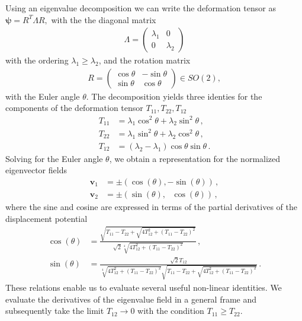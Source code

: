 \documentclass[a4paper, 11pt]{article}
\begin{document}
Using an eigenvalue decomposition we can write the deformation tensor as $\bm{\psi} = R^T \Lambda R,$ with the the diagonal matrix
\begin{align}
\Lambda = \begin{pmatrix}\lambda_1 & 0 \\ 0 &\lambda_2 \end{pmatrix}
\end{align}
with the ordering $\lambda_1 \geq \lambda_2$, and the rotation matrix
\begin{align}
R = \begin{pmatrix} \cos \theta & - \sin \theta \\ \sin \theta & \cos \theta \end{pmatrix} \in SO(2),
\end{align}
with the Euler angle $\theta$. The decomposition yields three identies for the components of the deformation tensor $T_{11},T_{22},T_{12}$ 
\begin{align}
T_{11} &= \lambda_1 \cos^2 \theta + \lambda_2 \sin^2 \theta\,,\\
T_{22} &= \lambda_1 \sin^2\theta + \lambda_2 \cos^2 \theta\,,\\
T_{12} &= (\lambda_2 - \lambda_1)\cos \theta \sin \theta\,.
\end{align}
Solving for the Euler angle $\theta$, we obtain a representation for the normalized eigenvector fields
\begin{align}
\bm{v}_1 &=\pm (\cos(\theta), -\sin(\theta))\,,\\
\bm{v}_2 &=\pm (\sin(\theta),\ \ \ \cos(\theta))\,,
\end{align}
where the sine and cosine are expressed in terms of the partial derivatives of the displacement potential
\begin{align}
\cos(\theta) &= \frac{\sqrt{T_{11} - T_{22} + \sqrt{4 T_{12}^2 +(T_{11}-T_{22})^2}}}{\sqrt{2} \sqrt[4]{4T_{12}^2 + (T_{11}-T_{22})^2}}\,,\\
\sin(\theta) &= \frac{\sqrt{2}T_{12}}{\sqrt[4]{4T_{12}^2+(T_{11}-T_{22})^2}\sqrt{T_{11}-T_{22} + \sqrt{4T_{12}^2 + (T_{11}-T_{22})^2}}}\,.
\end{align}
These relations enable us to evaluate several useful non-linear identities. We evaluate the derivatives of the eigenvalue field in a general frame and subsequently take the limit $T_{12} \to 0$ with the condition $T_{11}\geq T_{22}$. 
\end{document}
